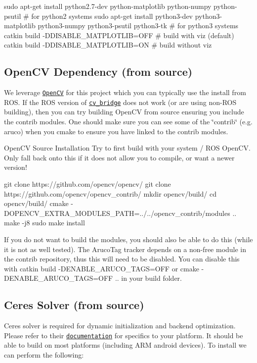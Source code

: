 \begin{DoxyCode}
sudo apt-get install python2.7-dev python-matplotlib python-numpy python-psutil # for python2 systems
sudo apt-get install python3-dev python3-matplotlib python3-numpy python3-psutil python3-tk # for python3
       systems
catkin build -DDISABLE\_MATPLOTLIB=OFF # build with viz (default)
catkin build -DDISABLE\_MATPLOTLIB=ON # build without viz
\end{DoxyCode}
\hypertarget{gs-installing_gs-install-opencv}{}\subsection{Open\+C\+V Dependency (from source)}\label{gs-installing_gs-install-opencv}
We leverage \href{https://opencv.org/}{\tt Open\+CV} for this project which you can typically use the install from R\+OS. If the R\+OS version of \href{http://wiki.ros.org/cv_bridge}{\tt cv\+\_\+bridge} does not work (or are using non-\/\+R\+OS building), then you can try building Open\+CV from source ensuring you include the contrib modules. One should make sure you can see some of the \char`\"{}contrib\char`\"{} (e.\+g. aruco) when you cmake to ensure you have linked to the contrib modules.



\begin{DoxyParagraph}{Open\+CV Source Installation}
Try to first build with your system / R\+OS Open\+CV. Only fall back onto this if it does not allow you to compile, or want a newer version!
\end{DoxyParagraph}

\begin{DoxyCode}
git clone https://github.com/opencv/opencv/
git clone https://github.com/opencv/opencv\_contrib/
mkdir opencv/build/
cd opencv/build/
cmake -DOPENCV\_EXTRA\_MODULES\_PATH=../../opencv\_contrib/modules ..
make -j8
sudo make install
\end{DoxyCode}


If you do not want to build the modules, you should also be able to do this (while it is not as well tested). The Aruco\+Tag tracker depends on a non-\/free module in the contrib repository, thus this will need to be disabled. You can disable this with {\ttfamily catkin build -\/\+D\+E\+N\+A\+B\+L\+E\+\_\+\+A\+R\+U\+C\+O\+\_\+\+T\+A\+GS=O\+FF} or {\ttfamily cmake -\/\+D\+E\+N\+A\+B\+L\+E\+\_\+\+A\+R\+U\+C\+O\+\_\+\+T\+A\+GS=O\+FF ..} in your build folder.\hypertarget{gs-installing_gs-install-ceres}{}\subsection{Ceres Solver (from source)}\label{gs-installing_gs-install-ceres}
Ceres solver \cite{ceres-solver} is required for dynamic initialization and backend optimization. Please refer to their \href{http://ceres-solver.org/installation.html#linux}{\tt documentation} for specifics to your platform. It should be able to build on most platforms (including A\+RM android devices). To install we can perform the following\+:



